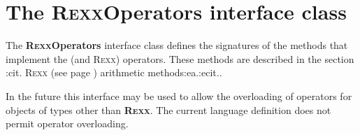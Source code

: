 \chapter{The R\textsc{exx}Operators interface class}\label{refnlrops}
 
The \textbf{R\textsc{exx}Operators} interface class defines the signatures of
the methods that implement the \nr{} (and R\textsc{exx}) operators.  These
methods are described in the section :cit. R\textsc{exx} (see page \pageref{refrexxops}) 
arithmetic methods:ea.:ecit..
 
In the future this interface may be used to allow the overloading of
operators for objects of types other than \textbf{R\textsc{exx}}.  The current
\nr{} language definition does not permit operator overloading.
